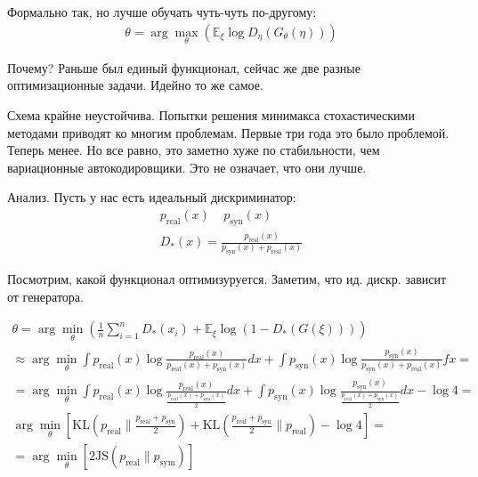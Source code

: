 \documentclass{book}
\begin{document}
Формально так, но лучше обучать чуть-чуть по-другому:
\begin{gather*}
  \theta=\arg\max_\theta \left(\mathbb{E}_\xi \log D_\eta\left(G_\theta\left(\eta\right)\right)\right)
\end{gather*}

Почему? Раньше был единый функционал, сейчас же две разные оптимизационные задачи. Идейно то же самое.


Схема крайне неустойчива. Попытки решения минимакса стохастическими методами приводят ко многим проблемам. Первые три года это было проблемой. Теперь менее. Но все равно, это заметно хуже по стабильности, чем вариационные автокодировщики. Это не означает, что они лучше.

Анализ. Пусть у нас есть идеальный дискриминатор:
\begin{gather*}
  p_\mathrm{real}(x)~~~~~p_\mathrm{syn}(x)\\
  D_*(x)=\frac{p_\mathrm{real}(x)}{p_\mathrm{syn}(x)+p_\mathrm{real}(x)}
\end{gather*}

Посмотрим, какой функционал оптимизуруется. Заметим, что ид. дискр. зависит от генератора.

\begin{gather*}
  \theta=\arg\min_\theta \left(\frac{1}{n}\sum_{i=1}^{n} {D_*(x_i)}+\mathbb{E}_\xi \log(1-D_*(G(\xi)))\right)\\
  \approx \arg\min_\theta \int {p_\mathrm{real}(x)\log\frac{p_\mathrm{real}(x)}{p_\mathrm{real}(x)+p_\mathrm{syn}(x)}dx}+\int {p_\mathrm{syn}(x)\log\frac{p_\mathrm{syn}(x)}{p_\mathrm{syn}(x)+p_\mathrm{real}(x)}fx}=\\
  = \arg\min_\theta \int {p_\mathrm{real}(x)\log\frac{p_\mathrm{real}(x)}{\frac{p_\mathrm{real}(x)+p_\mathrm{syn}(x)}{2}}dx}+\int {p_\mathrm{syn}(x)\log\frac{p_\mathrm{syn}(x)}{\frac{p_\mathrm{real}(x)+p_\mathrm{syn}(x)}{2}}dx}-\log 4=\\
  \arg\min_\theta\left[\mathrm{KL}(p_\mathrm{real} \| \frac{p_\mathrm{real}+p_\mathrm{syn}}{2})+\mathrm{KL}(\frac{p_\mathrm{real}+p_\mathrm{syn}}{2} \| p_\mathrm{real}) - \log 4\right]=\\
  =\arg\min_\theta\left[2\mathrm{JS}(p_\mathrm{real}\|p_\mathrm{sym})\right]
\end{gather*}
\end{document}
